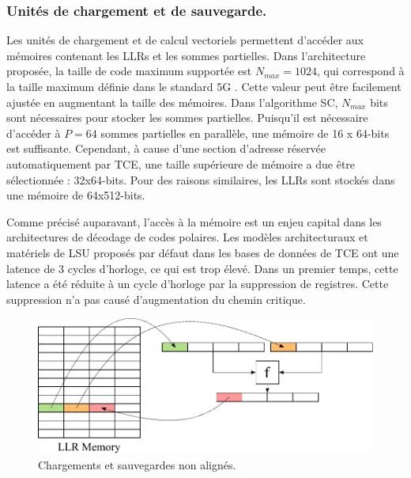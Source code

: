 \subsubsection{Unités de chargement et de sauvegarde.}



Les unités de chargement et de calcul vectoriels permettent d'accéder aux mémoires contenant les LLRs et les sommes partielles. Dans l'architecture proposée, la taille de code maximum supportée est $N_{max}=1024$, qui correspond à la taille maximum définie dans le standard 5G \cite{3gpp_ts_2017}. Cette valeur peut être facilement ajustée en augmentant la taille des mémoires. Dans l'algorithme SC, $N_{max}$ bits sont nécessaires pour stocker les sommes partielles. Puisqu'il est nécessaire d'accéder à $P=64$ sommes partielles en parallèle, une mémoire de 16 x 64-bits est suffisante. Cependant, à cause d'une section d'adresse réservée automatiquement par TCE, une taille supérieure de mémoire a due être sélectionnée : 32x64-bits. Pour des raisons similaires, les LLRs sont stockés dans une mémoire de 64x512-bits.

Comme précisé auparavant, l'accès à la mémoire est un enjeu capital dans les architectures de décodage de codes polaires. Les modèles architecturaux et matériels de LSU proposés par défaut dans les bases de données de TCE ont une latence de 3 cycles d'horloge, ce qui est trop élevé. Dans un premier temps, cette latence a été réduite à un cycle d'horloge par la suppression de registres. Cette suppression n'a pas causé d'augmentation du chemin critique.
\begin{figure}[htp]
	\centering
	\includegraphics[width=\textwidth]{main/ch4_fig/unaligned}
	\caption{Chargements et sauvegardes non alignés.}
	\label{fig:unaligned}
\end{figure}

